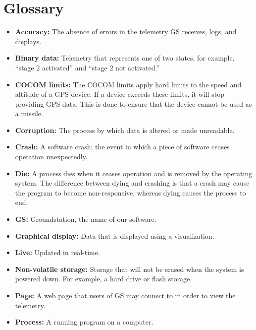\documentclass[10pt,draftclsnofoot,onecolumn]{IEEEtran}
\begin{document}
	\section{Glossary}
		\begin{itemize}
		\item \textbf{Accuracy:} The absence of errors in the telemetry GS receives, logs, and displays.
		\item \textbf{Binary data:} Telemetry that represents one of two states, for example, ``stage 2 activated'' and
		``stage 2 not activated.''		
		\item \textbf{COCOM limits:} The \ac{COCOM} limits apply hard limits to the speed and altitude of a GPS device.
		If a device exceeds these limits, it will stop providing GPS data.
		This is done to ensure that the device cannot be used as a missile.		
		\item \textbf{Corruption:} The process by which data is altered or made unreadable.
		\item \textbf{Crash:} A software crash; the event in which a piece of software ceases operation unexpectedly.
		\item \textbf{Die:} A process dies when it ceases operation and is removed by the operating system.
		The difference between dying and crashing is that a crash may cause the program to become non-responsive,
		whereas dying causes the process to end.
		\item \textbf{GS:} Groundstation, the name of our software.
		\item \textbf{Graphical display:} Data that is displayed using a visualization.
		\item \textbf{Live:} Updated in real-time.
		\item \textbf{Non-volatile storage:} Storage that will not be erased when the system is powered down.
		For example, a hard drive or flash storage.
		\item \textbf{Page:} A web page that users of GS may connect to in order to view the telemetry.
		\item \textbf{Process:} A running program on a computer.

\end{itemize}
\end{document}
